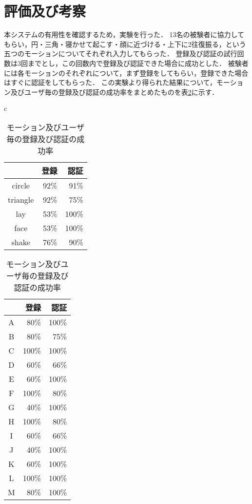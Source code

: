 \section{評価及び考察}
本システムの有用性を確認するため，実験を行った．
13名の被験者に協力してもらい，円・三角・寝かせて起こす・顔に近づける・上下に2往復振る，という五つのモーションについてそれぞれ入力してもらった．
登録及び認証の試行回数は3回までとし，この回数内で登録及び認証できた場合に成功とした．
被験者には各モーションのそれぞれについて，まず登録をしてもらい，登録できた場合はすぐに認証をしてもらった．
この実験より得られた結果について，モーション及びユーザ毎の登録及び認証の成功率をまとめたものを表\ref{test}に示す．

\begin{table}[htbp]
    \centering
    \caption{モーション及びユーザ毎の登録及び認証の成功率}
    \begin{tabular}{c}
        \begin{minipage}{0.46\hsize}
            \centering
            \begin{tabular}{|c|r|r|} \hline
                & 登録 & 認証 \\ \hline
                circle & 92\% & 91\% \\ \hline
                triangle & 92\%  & 75\% \\ \hline
                lay & 53\% & 100\% \\ \hline
                face & 53\% & 100\% \\ \hline
                shake & 76\% & 90\% \\ \hline
            \end{tabular}
        \end{minipage}
        \begin{minipage}{0.46\hsize}
            \centering
            \begin{tabular}{|c|r|r|} \hline
                & 登録 & 認証 \\ \hline
                A & 80\% & 100\% \\ \hline
                B & 80\% & 75\% \\ \hline
                C & 100\% & 100\% \\ \hline
                D & 60\% & 66\% \\ \hline
                E & 60\% & 100\% \\ \hline
                F & 100\% & 80\% \\ \hline
                G & 40\% & 100\% \\ \hline
                H & 100\% & 80\% \\ \hline
                I & 60\% & 66\% \\ \hline
                J & 40\% & 100\% \\ \hline
                K & 60\% & 100\% \\ \hline
                L & 100\% & 100\% \\ \hline
                M & 80\% & 100\% \\ \hline
            \end{tabular}
        \end{minipage}
    \end{tabular}
    \label{test}
\end{table}

